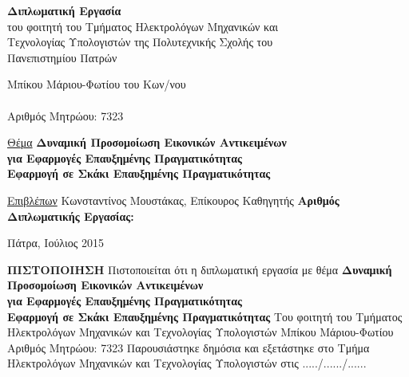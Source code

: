 \begin{center}
\LARGE\textbf{Διπλωματική Εργασία}\\
\Large
του φοιτητή του Τμήματος Ηλεκτρολόγων Μηχανικών και\\
Τεχνολογίας Υπολογιστών της Πολυτεχνικής Σχολής του\\
Πανεπιστημίου Πατρών
\end{center}
\vskip0.5cm
\begin{center}
\LARGE
Μπίκου Μάριου-Φωτίου του Κων/νου\\
~~\\
Αριθμός Μητρώου: 7323
\end{center}

\vskip1cm
\begin{center}
\LARGE
\underline{Θέμα}
\vskip0.3cm
\textbf{Δυναμική Προσομοίωση Εικονικών Αντικειμένων \\ για Εφαρμογές Επαυξημένης Πραγματικότητας}
\\
\Large 
\textbf{Εφαρμογή σε Σκάκι Επαυξημένης Πραγματικότητας}

\end{center}

\vskip1cm
\begin{center}
\Large
\underline{Επιβλέπων}
\vskip0.2cm
Κωνσταντίνος Μουστάκας, Επίκουρος Καθηγητής
\vskip1cm
\textbf{Αριθμός Διπλωματικής Εργασίας:}
\end{center}
\vfill
\centerline{
\Large Πάτρα, Ιούλιος 2015
}
\clearpage
\null\clearpage %



\begin{center}
\LARGE
\textbf{ΠΙΣΤΟΠΟΙΗΣΗ}
\vskip0.5cm
Πιστοποιείται ότι η διπλωματική εργασία με θέμα
\vskip0.5cm
\textbf{Δυναμική Προσομοίωση Εικονικών Αντικειμένων \\ για Εφαρμογές Επαυξημένης Πραγματικότητας}
\\
{\Large 
\textbf{Εφαρμογή σε Σκάκι Επαυξημένης Πραγματικότητας}
}
\vskip2cm
Του φοιτητή του Τμήματος Ηλεκτρολόγων Μηχανικών και Τεχνολογίας Υπολογιστών
\vskip1cm
{\Large Μπίκου Μάριου-Φωτίου\\
\vskip0.5cm
Αριθμός Μητρώου: 7323
\vskip2cm
Παρουσιάστηκε δημόσια και εξετάστηκε στο Τμήμα Ηλεκτρολόγων Μηχανικών και Τεχνολογίας Υπολογιστών στις ...../....../......}
\end{center}

\vfill

